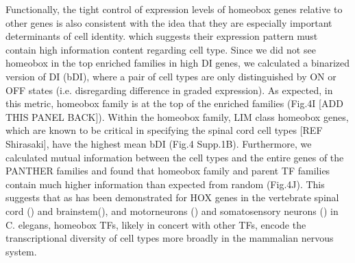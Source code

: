Functionally, the tight control of expression levels of homeobox genes relative to other genes is also consistent with the idea that they are especially important determinants of cell identity.  which suggests their expression pattern must contain high information content regarding cell type. Since we did not see homeobox in the top enriched families in high DI genes, we calculated a binarized version of DI (bDI), where a pair of cell types are only distinguished by ON or OFF states (i.e. disregarding difference in graded expression). As expected, in this metric, homeobox family is at the top of the enriched families (Fig.4I [ADD THIS PANEL BACK]). Within the homeobox family, LIM class homeobox genes, which are known to be critical in specifying the spinal cord cell types [REF Shirasaki], have the highest mean bDI (Fig.4 Supp.1B). Furthermore, we calculated mutual information between the cell types and the entire genes of the PANTHER families and found that homeobox family and parent TF families contain much higher information than expected from random (Fig.4J). This suggests that as has been demonstrated for HOX genes in the vertebrate spinal cord () and brainstem(), and motorneurons () and somatosensory neurons () in C. elegans, homeobox TFs, likely in concert with other TFs, encode the transcriptional diversity of cell types more broadly in the mammalian nervous system.
